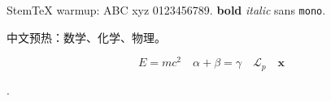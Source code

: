 


\begin{preview}

StemTeX warmup: ABC xyz 0123456789.
\textbf{bold} \textit{italic} \textsf{sans} \texttt{mono}.

中文预热：数学、化学、物理。

\[
  E=mc^2 \quad \alpha+\beta=\gamma \quad \mathcal{L}_{p} \quad \mathbf{x}
\]

 .

\end{preview}

